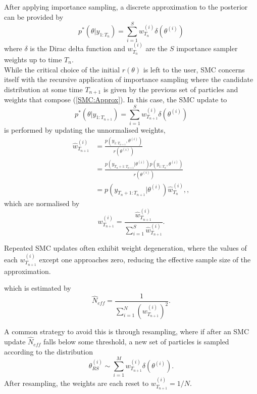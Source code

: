 \documentclass[
12pt, %
onehalfspacing, %
nohyperref, %
headsepline, %
chapterinoneline, %
]{MastersDoctoralThesis} %
\begin{document}
After applying importance sampling, a discrete approximation to the posterior can be provided by
\begin{equation}
\label{SMC:Approx}
p^*(\theta | y_{1:T_n}) = \sum_{i=1}^S w^{(i)}_{T_n} \delta(\theta^{(i)})
\end{equation}
where $\delta$ is the Dirac delta function and $w^{(i)}_{T_n}$ are the $S$ importance sampler weights up to time $T_n$.
\\

While the critical choice of the initial $r(\theta)$ is left to the user, SMC concerns itself with the recursive application of importance sampling where the candidate distribution at some time $T_{n+1}$ is given by the previous set of particles and weights that compose (\ref{SMC:Approx}). In this case, the SMC update to 
\begin{equation}
\label{SMC:Update}
p^*(\theta | y_{1:T_{n+1}}) = \sum_{i=1}^S w^{(i)}_{T_{n+1}} \delta(\theta^{(i)})
\end{equation}
is performed by updating the unnormalised weights,
\begin{align}
\hat{w}^{(i)}_{T_{n+1}} &= \frac{p(y_{1:T_{n+1}}, \theta^{(i)})}{r(\theta^{(i)})} \nonumber \\
&= \frac{p(y_{T_{n}+1:T_{n+1}} | \theta^{(i)}) p(y_{1:T_n}, \theta^{(i)})}{r(\theta^{(i)})} \nonumber \\
&= p(y_{T_{n}+1:T_{n+1}}| \theta^{(i)}) \hat{w}^{(i)}_{T_n}, \label{SMC:UpdateWeights},
\end{align}
which are normalised by
\begin{equation}
\label{SMC:UpdateWeightsNorm}
w^{(i)}_{T_{n+1}} = \frac{\hat{w}^{(i)}_{T_{n+1}}}{\sum_{i=1}^S \hat{w}^{(i)}_{T_{n+1}}}.
\end{equation}

Repeated SMC updates often exhibit weight degeneration, where the values of each $w^{(i)}_{T_{n+1}}$ except one approaches zero, reducing the effective sample size of the approximation.
\iffalse

 which is estimated by
\begin{equation}
\label{SMC:EFF}
\hat{N}_{eff} = \frac{1}{\sum_{i=1}^N (w^{(i)}_{T_{n+1}})^2}.
\end{equation}

A common strategy to avoid this is through resampling, where if after an SMC update $\hat{N}_{eff}$ falls below some threshold, a new set of particles is sampled according to the distribution
\begin{equation}
\label{SMC:Resample}
\theta^{(i)}_{RS} \sim \sum_{i=1}^M w^{(i)}_{T_{n+1}} \delta(\theta^{(i)}).
\end{equation}
After resampling, the weights are each reset to $w^{(i)}_{T_{n+1}} = 1/N$. 
\\
\end{document}
